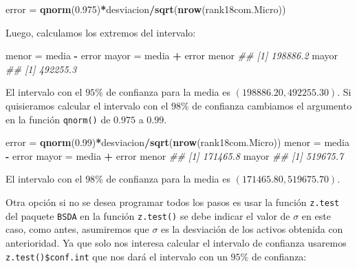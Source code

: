 \documentclass[letterpaper,]{book}
\newenvironment{Shaded}{\begin{snugshade}}{\end{snugshade}}
\newcommand{\CommentTok}[1]{\textcolor[rgb]{0.56,0.35,0.01}{\textit{#1}}}
\newcommand{\FloatTok}[1]{\textcolor[rgb]{0.00,0.00,0.81}{#1}}
\newcommand{\KeywordTok}[1]{\textcolor[rgb]{0.13,0.29,0.53}{\textbf{#1}}}
\newcommand{\NormalTok}[1]{#1}
\newcommand{\OperatorTok}[1]{\textcolor[rgb]{0.81,0.36,0.00}{\textbf{#1}}}
\newcommand{\StringTok}[1]{\textcolor[rgb]{0.31,0.60,0.02}{#1}}
\begin{document}
\begin{Shaded}
\begin{Highlighting}[]
\NormalTok{error  =}\StringTok{ }\KeywordTok{qnorm}\NormalTok{(}\FloatTok{0.975}\NormalTok{)}\OperatorTok{*}\NormalTok{desviacion}\OperatorTok{/}\KeywordTok{sqrt}\NormalTok{(}\KeywordTok{nrow}\NormalTok{(rank18com.Micro))}
\end{Highlighting}
\end{Shaded}

Luego, calculamos los extremos del intervalo:

\begin{Shaded}
\begin{Highlighting}[]

\NormalTok{menor =}\StringTok{ }\NormalTok{media }\OperatorTok{-}\StringTok{ }\NormalTok{error}
\NormalTok{mayor =}\StringTok{ }\NormalTok{media }\OperatorTok{+}\StringTok{ }\NormalTok{error}
\NormalTok{menor}
\CommentTok{## [1] 198886.2}
\NormalTok{mayor}
\CommentTok{## [1] 492255.3}
\end{Highlighting}
\end{Shaded}

El intervalo con el \(95\%\) de confianza para la media es \(\left( 198886.20, 492255.30 \right)\). Si quisieramos calcular el intervalo con el \(98\%\) de confianza cambiamos el argumento en la función \texttt{qnorm()} de \(0.975\) a \(0.99\).

\begin{Shaded}
\begin{Highlighting}[]

\NormalTok{error  =}\StringTok{ }\KeywordTok{qnorm}\NormalTok{(}\FloatTok{0.99}\NormalTok{)}\OperatorTok{*}\NormalTok{desviacion}\OperatorTok{/}\KeywordTok{sqrt}\NormalTok{(}\KeywordTok{nrow}\NormalTok{(rank18com.Micro))}
\NormalTok{menor =}\StringTok{ }\NormalTok{media }\OperatorTok{-}\StringTok{ }\NormalTok{error}
\NormalTok{mayor =}\StringTok{ }\NormalTok{media }\OperatorTok{+}\StringTok{ }\NormalTok{error}
\NormalTok{menor}
\CommentTok{## [1] 171465.8}
\NormalTok{mayor}
\CommentTok{## [1] 519675.7}
\end{Highlighting}
\end{Shaded}

El intervalo con el \(98\%\) de confianza para la media es \(\left( 171465.80, 519675.70 \right)\).

Otra opción si no se desea programar todos los pasos es usar la función \texttt{z.test} del paquete \texttt{BSDA} en la función \texttt{z.test()} se debe indicar el valor de \(\sigma\) en este caso, como antes, asumiremos que \(\sigma\) es la desviación de los activos obtenida con anterioridad. Ya que solo nos interesa calcular el intervalo de confianza usaremos \texttt{z.test()\$conf.int} que nos dará el intervalo con un \(95\%\) de confianza:
\end{document}
